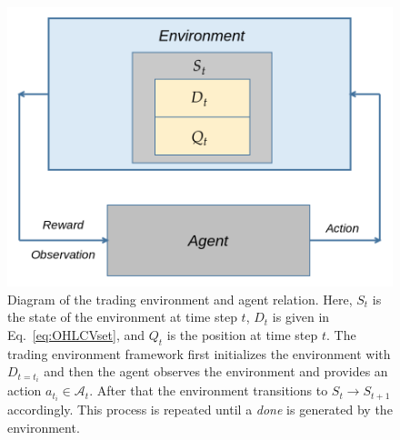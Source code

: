 \documentclass[conference]{IEEEtran}
\begin{document}
\begin{figure}
    \centering
    \includegraphics[scale=0.35]{Figs/Figures/TradeEnvironment.png}
    \caption{Diagram of the trading environment and agent relation. Here, \(S_t\) is the state of the environment at time step \(t\), \(D_t\) is given in Eq.~\eqref{eq:OHLCVset}, and \(Q_t\) is the position at time step \(t\). The trading environment framework first initializes the environment with \(D_{t=t_i}\) and then the agent observes the environment and provides an action \(a_{t_i} \in \mathcal{A}_t\). After that the environment transitions to \(S_{t} \rightarrow S_{t+1}\) accordingly. This process is repeated until a \textit{done} is generated by the environment.} 
\end{figure}
\end{document}
